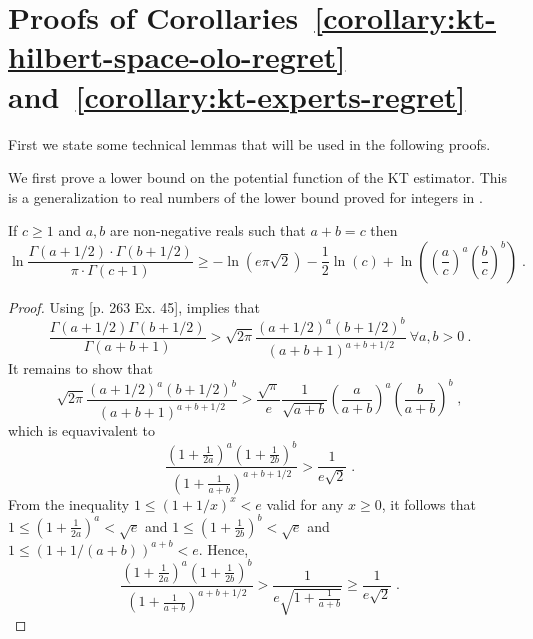 \section{Proofs of Corollaries~\ref{corollary:kt-hilbert-space-olo-regret} and~\ref{corollary:kt-experts-regret}}
\label{section:corollaries_reductions}

First we state some technical lemmas that will be used in the following proofs.

We first prove a lower bound on the potential function of the \ac{KT} estimator. This is a generalization to real numbers of the lower bound proved for integers in \citet{WillemsST95}.
\begin{lemma}
\label{lemma:approx_gamma_real}
If $c\geq1$ and $a,b$ are non-negative reals such that $a +
b = c$ then
$$
\ln \frac{\Gamma(a + 1/2) \cdot \Gamma(b + 1/2)}{\pi \cdot \Gamma(c+1)}
\geq - \ln(e \pi \sqrt{2}) -\frac{1}{2} \ln(c) +\ln \left(\left( \frac{a}{c} \right)^a \left( \frac{b}{c} \right)^b\right) \; .
$$
\end{lemma}
%
\begin{proof}
Using \cite{WhittakerW27}[p. 263 Ex. 45], implies that
\[
\frac{\Gamma(a+1/2)\Gamma(b+1/2)}{\Gamma(a+b+1)} > \sqrt{2\pi} \frac{(a+1/2)^a (b+1/2)^b}{(a+b+1)^{a+b+1/2}} \ \forall a,b>0~.
\]
It remains to show that
$$
\sqrt{2\pi} \frac{(a+1/2)^a (b+1/2)^b}{(a+b+1)^{a+b+1/2}} > \frac{\sqrt{\pi}}{e} \frac{1}{\sqrt{a+b}} \left( \frac{a}{a+b} \right)^a \left( \frac{b}{a+b} \right)^b \; ,
$$
which is equavivalent to
$$
\frac{(1+\frac{1}{2a})^a (1+\frac{1}{2b})^b}{(1+\frac{1}{a+b})^{a+b+1/2}} > \frac{1}{e\sqrt{2}} \; .
$$
From the inequality $1 \le (1+1/x)^x < e$ valid for any $x \ge 0$, it follows
that $1 \le (1+\frac{1}{2a})^a < \sqrt{e}$ and $1 \le (1+\frac{1}{2b})^b < \sqrt{e}$
and $1 \le (1+1/(a+b))^{a+b} < e$. Hence,
$$
\frac{(1+\frac{1}{2a})^a (1+\frac{1}{2b})^b}{(1+\frac{1}{a+b})^{a+b+1/2}}
> \frac{1}{e \sqrt{1 + \frac{1}{a+b}}}
\ge \frac{1}{e \sqrt{2}} \; .
$$
\end{proof}


